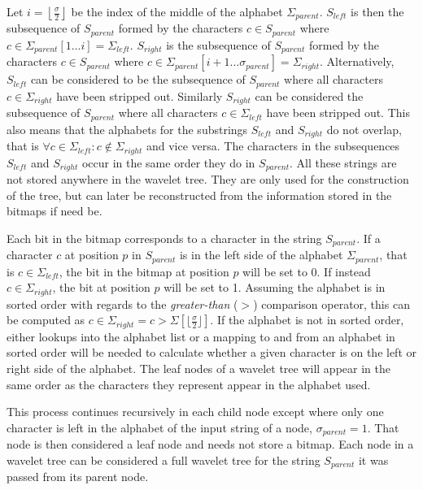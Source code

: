 Let $i = \left\lfloor\frac{\sigma}{2}\right\rfloor$ be the index of the middle of the alphabet $\Sigma_{parent}$.
$S_{left}$ is then the subsequence of $S_{parent}$ formed by the characters $c \in S_{parent}$ where $c \in \Sigma_{parent}[1 \ldots i] = \Sigma_{left}$.
$S_{right}$ is the subsequence of $S_{parent}$ formed by the characters $c \in S_{parent}$ where $c \in \Sigma_{parent}[i+1 \ldots \sigma_{parent}] = \Sigma_{right}$.
Alternatively, $S_{left}$ can be considered to be the subsequence of $S_{parent}$ where all characters $c \in \Sigma_{right}$ have been stripped out. Similarly $S_{right}$ can be considered the subsequence of $S_{parent}$ where all characters $c \in \Sigma_{left}$ have been stripped out.
This also means that the alphabets for the substrings $S_{left}$ and $S_{right}$ do not overlap, that is $\forall c \in \Sigma_{left}: c \notin \Sigma_{right}$ and vice versa.
The characters in the subsequences $S_{left}$ and $S_{right}$ occur in the same order they do in $S_{parent}$.
All these strings are not stored anywhere in the wavelet tree.
They are only used for the construction of the tree, but can later be reconstructed from the information stored in the bitmaps if need be.

Each bit in the bitmap corresponds to a character in the string $S_{parent}$.
If a character $c$ at position $p$ in $S_{parent}$ is in the left side of the alphabet $\Sigma_{parent}$, that is $c \in \Sigma_{left}$, the bit in the bitmap at position $p$ will be set to 0.
If instead $c \in \Sigma_{right}$, the bit at position $p$ will be set to 1.
Assuming the alphabet is in sorted order with regards to the \textit{greater-than} ($>$) comparison operator, this can be computed as $c \in \Sigma_{right} = c > \Sigma[\lfloor\frac{\sigma}{2}\rfloor]$.
If the alphabet is not in sorted order, either lookups into the alphabet list or a mapping to and from an alphabet in sorted order will be needed to calculate whether a given character is on the left or right side of the alphabet.
The leaf nodes of a wavelet tree will appear in the same order as the characters they represent appear in the alphabet used.

This process continues recursively in each child node except where only one character is left in the alphabet of the input string of a node, $\sigma_{parent} = 1$.
That node is then considered a leaf node and needs not store a bitmap.
Each node in a wavelet tree can be considered a full wavelet tree for the string $S_{parent}$ it was passed from its parent node.

